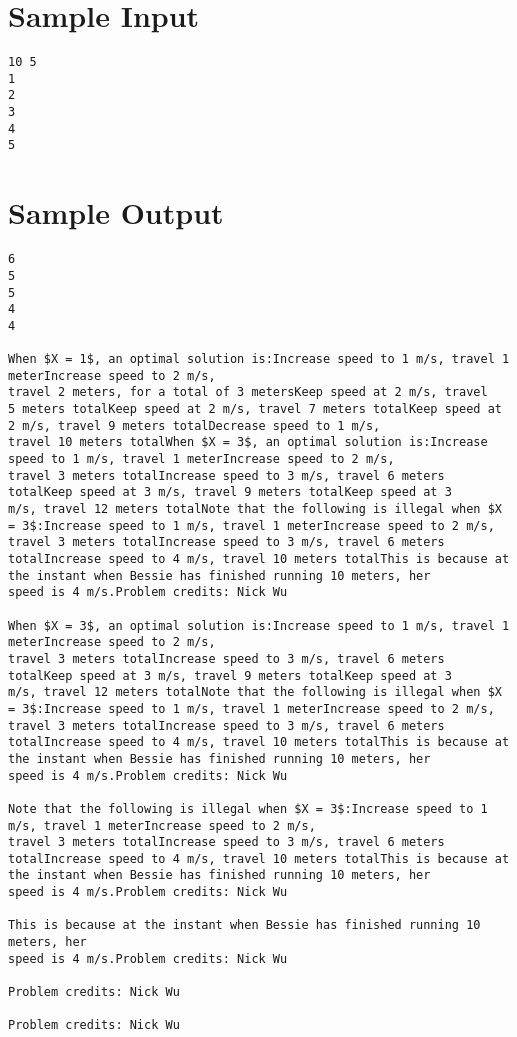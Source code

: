 \documentclass[12pt]{article}
\begin{document}
\section*{Sample Input}
\begin{verbatim}
10 5
1
2
3
4
5
\end{verbatim}

\section*{Sample Output}
\begin{verbatim}
6
5
5
4
4

When $X = 1$, an optimal solution is:Increase speed to 1 m/s, travel 1 meterIncrease speed to 2 m/s,
travel 2 meters, for a total of 3 metersKeep speed at 2 m/s, travel
5 meters totalKeep speed at 2 m/s, travel 7 meters totalKeep speed at 2 m/s, travel 9 meters totalDecrease speed to 1 m/s,
travel 10 meters totalWhen $X = 3$, an optimal solution is:Increase speed to 1 m/s, travel 1 meterIncrease speed to 2 m/s,
travel 3 meters totalIncrease speed to 3 m/s, travel 6 meters totalKeep speed at 3 m/s, travel 9 meters totalKeep speed at 3
m/s, travel 12 meters totalNote that the following is illegal when $X = 3$:Increase speed to 1 m/s, travel 1 meterIncrease speed to 2 m/s,
travel 3 meters totalIncrease speed to 3 m/s, travel 6 meters totalIncrease speed to 4 m/s, travel 10 meters totalThis is because at the instant when Bessie has finished running 10 meters, her
speed is 4 m/s.Problem credits: Nick Wu

When $X = 3$, an optimal solution is:Increase speed to 1 m/s, travel 1 meterIncrease speed to 2 m/s,
travel 3 meters totalIncrease speed to 3 m/s, travel 6 meters totalKeep speed at 3 m/s, travel 9 meters totalKeep speed at 3
m/s, travel 12 meters totalNote that the following is illegal when $X = 3$:Increase speed to 1 m/s, travel 1 meterIncrease speed to 2 m/s,
travel 3 meters totalIncrease speed to 3 m/s, travel 6 meters totalIncrease speed to 4 m/s, travel 10 meters totalThis is because at the instant when Bessie has finished running 10 meters, her
speed is 4 m/s.Problem credits: Nick Wu

Note that the following is illegal when $X = 3$:Increase speed to 1 m/s, travel 1 meterIncrease speed to 2 m/s,
travel 3 meters totalIncrease speed to 3 m/s, travel 6 meters totalIncrease speed to 4 m/s, travel 10 meters totalThis is because at the instant when Bessie has finished running 10 meters, her
speed is 4 m/s.Problem credits: Nick Wu

This is because at the instant when Bessie has finished running 10 meters, her
speed is 4 m/s.Problem credits: Nick Wu

Problem credits: Nick Wu

Problem credits: Nick Wu
\end{verbatim}
\end{document}
